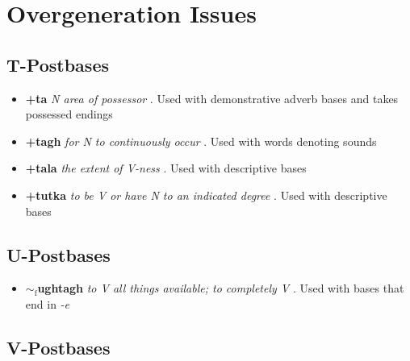 \documentclass{article}
\begin{document}

\section{Overgeneration Issues}

\subsection{\textbf{T}-Postbases}

\begin{itemize}
\renewcommand\labelitemi{$\cdot$}

\item \textbf{+ta} \textit{N area of possessor} . Used with demonstrative adverb bases and takes possessed endings

\item \textbf{+tagh} \textit{for N to continuously occur} . Used with words denoting sounds

\item \textbf{+tala} \textit{the extent of V-ness} . Used with descriptive bases

\item \textbf{+tutka} \textit{to be V or have N to an indicated degree} . Used with descriptive bases

\end{itemize}

\subsection{\textbf{U}-Postbases}

\begin{itemize}
\renewcommand\labelitemi{$\cdot$}

\item \textbf{$\sim_\text{f}$ughtagh} \textit{to V all things available; to completely V} . Used with bases that end in \textit{-e} 

\end{itemize}

\subsection{\textbf{V}-Postbases}
\end{document}
